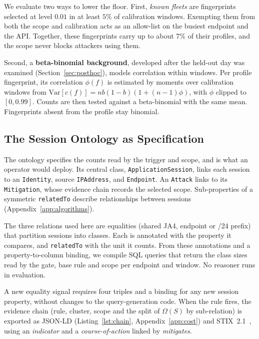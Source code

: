 \documentclass[conference,letterpaper,10pt]{IEEEtran}
\newcommand\1{\textit{(i)}}
\newcommand\2{\textit{(ii)}}
\newcommand\3{\textit{(iii)}}
\newcommand\4{\textit{(iv)}}
\newcommand\5{\textit{(v)}}
\newcommand\6{\textit{(vi)}}
\newcommand\7{\textit{(vii)}}
\newcommand\8{\textit{(viii)}}
\newcommand\9{\textit{(ix)}}
\begin{document}
We evaluate two ways to lower the floor.
First, \textit{known fleets} are fingerprints selected
at level $0.01$ in at least $5\%$ of calibration
windows. Exempting them from both the scope and
calibration acts as an allow-list on the busiest
endpoint and the API. Together, these fingerprints carry up
to about $7\%$ of their profiles, and the scope never blocks
attackers using them.

Second, a \textbf{beta-binomial background}, developed
after the held-out day was examined
(Section~\ref{sec:posthoc}), models correlation
within windows. Per profile fingerprint, its correlation
$\phi(f)$ is estimated by moments over calibration windows
from
$\mathrm{Var}[c(f)]=nb(1-b)(1+(n-1)\phi)$,
with $\phi$ clipped to $[0,0.99]$.
Counts are then tested against a beta-binomial
with the same mean. Fingerprints absent from the profile stay binomial.

\subsection{The Session Ontology as Specification}
\label{sec:ontology}
\label{sec:pipeline}

The ontology specifies the counts read by the trigger and
scope, and is what an operator would deploy. Its central
class, \texttt{ApplicationSession},
links each session to an \texttt{Identity}, source
\texttt{IPAddress}, and \texttt{Endpoint}.
An \texttt{Attack} links to its \texttt{Mitigation},
whose evidence chain records the selected scope.
Sub-properties of a symmetric \texttt{relatedTo}
describe relationships between sessions
(Appendix~\ref{app:algorithms}).

The three relations used here are equalities (shared JA4,
endpoint or /24 prefix) that partition sessions into
classes. Each is annotated with the property it compares,
and \texttt{relatedTo} with the unit it counts.
From these annotations and a property-to-column binding, we
compile SQL queries that return the class sizes read by the
gate, base rule and scope per endpoint and window.
No reasoner runs in evaluation.

A new equality signal requires four triples and
a binding for any new session property, without
changes to the query-generation code. When the rule fires,
the evidence chain (rule, cluster, scope and the split of
$\Omega(S)$ by sub-relation) is exported as JSON-LD
(Listing~\ref{lst:chain}, Appendix~\ref{app:cost})
and STIX~2.1~\cite{oasis2021stix}, using an
\textit{indicator} and a \textit{course-of-action}
linked by \textit{mitigates}.
\end{document}
